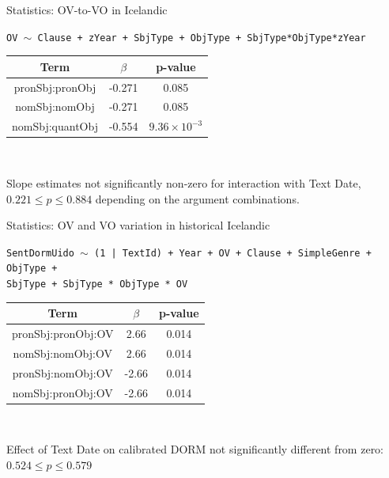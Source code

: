 \documentclass[hyperref={pdfpagelabels=false}]{beamer}
\begin{document}
\begin{frame}{Statistics: OV-to-VO in Icelandic} 
	
	\begin{center}
		\texttt{OV $\sim$ Clause + zYear + SbjType + ObjType + SbjType*ObjType*zYear}\\\vspace{5mm}

	\begin{tabular}{c c c}
		\textbf{Term} & \textbf{$\beta$} & \textbf{p-value} \\ \hline
		pronSbj:pronObj & -0.271 & 0.085\\
		nomSbj:nomObj & -0.271 & 0.085 \\
		nomSbj:quantObj & -0.554 & $9.36 \times 10^{-3}$
		
	\end{tabular}\\\vspace{5mm}

		Slope estimates not significantly non-zero for interaction with Text Date, $ 0.221 \leq p \leq 0.884$ depending on the argument combinations.
	\end{center}
	
\end{frame}

\begin{frame}{Statistics: OV and VO variation in historical Icelandic} 
	
	\begin{center}
		\texttt{SentDormUido $\sim$ (1 | TextId) + Year + OV + Clause + SimpleGenre +  ObjType + \\ SbjType + SbjType * ObjType * OV}\\\vspace{5mm}
	
	\begin{tabular}{c c c}
		\textbf{Term} & \textbf{$\beta$} & \textbf{p-value} \\ \hline
		pronSbj:pronObj:OV & 2.66 & 0.014\\
		nomSbj:nomObj:OV  & 2.66 & 0.014\\
		pronSbj:nomObj:OV  & -2.66 & 0.014\\
		nomSbj:pronObj:OV  & -2.66 & 0.014\\
	
		
	\end{tabular}\\\vspace{5mm}

		Effect of Text Date on calibrated DORM not significantly different from zero: \\$0.524 \leq p \leq 0.579$
	\end{center}
	
\end{frame}
\end{document}
